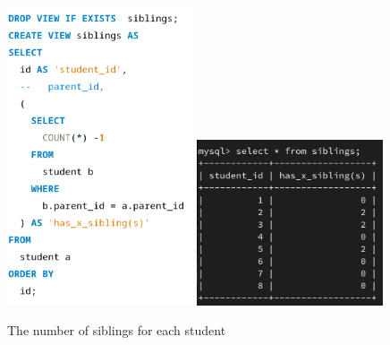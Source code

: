 \documentclass[a4paper]{scrreprt}
\begin{document}
\begin{figure}[h]
    \begin{center}
        \includegraphics[width=0.49\textwidth]{../img/siblingsSQLv2.png} 
        \includegraphics[width=0.49\textwidth]{../img/siblingsV2.png}
        \caption{The number of siblings for each student}
        \label{fig:siblings}
    \end{center}
\end{figure}
\end{document}
